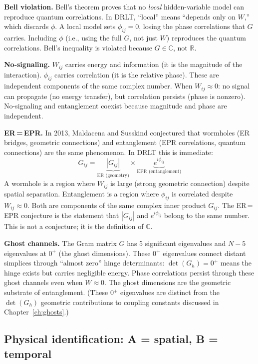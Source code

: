 \documentclass[12pt]{article}
\theoremstyle{remark}
\theoremstyle{definition}
\begin{document}
\textbf{Bell violation.} Bell's theorem proves that no \emph{local} hidden-variable model can reproduce quantum correlations. In DRLT, ``local'' means ``depends only on $W$,'' which discards $\phi$. A local model sets $\phi_{ij} = 0$, losing the phase correlations that $G$ carries. Including $\phi$ (i.e., using the full $G$, not just $W$) reproduces the quantum correlations. Bell's inequality is violated because $G \in \mathbb{C}$, not $\mathbb{R}$.

\textbf{No-signaling.} $W_{ij}$ carries energy and information (it is the magnitude of the interaction). $\phi_{ij}$ carries correlation (it is the relative phase). These are independent components of the same complex number. When $W_{ij} \approx 0$: no signal can propagate (no energy transfer), but correlation persists (phase is nonzero). No-signaling and entanglement coexist because magnitude and phase are independent.

\textbf{ER\,=\,EPR.} In 2013, Maldacena and Susskind conjectured that wormholes (ER bridges, geometric connections) and entanglement (EPR correlations, quantum connections) are the same phenomenon. In DRLT this is immediate:
\begin{equation}
G_{ij} = \underbrace{|G_{ij}|}_{\text{ER (geometry)}} \times \underbrace{e^{i\phi_{ij}}}_{\text{EPR (entanglement)}}
\end{equation}
A wormhole is a region where $W_{ij}$ is large (strong geometric connection) despite spatial separation. Entanglement is a region where $\phi_{ij}$ is correlated despite $W_{ij} \approx 0$. Both are components of the same complex inner product $G_{ij}$. The ER\,=\,EPR conjecture is the statement that $|G_{ij}|$ and $e^{i\phi_{ij}}$ belong to the same number. This is not a conjecture; it is the definition of $\mathbb{C}$.

\textbf{Ghost channels.} The Gram matrix $G$ has 5 significant eigenvalues and $N - 5$ eigenvalues at $0^+$ (the ghost dimensions). These $0^+$ eigenvalues connect distant simplices through ``almost zero'' hinge determinants: $\det(G_h) = 0^+$ means the hinge exists but carries negligible energy. Phase correlations persist through these ghost channels even when $W \approx 0$. The ghost dimensions are the geometric substrate of entanglement. (These 0$^+$ eigenvalues are distinct from the $\det(G_h)$ geometric contributions to coupling constants discussed in Chapter~\ref{ch:ghosts}.)

\subsection{Physical identification: A = spatial, B = temporal}
\label{sec:causal_split}
\end{document}
